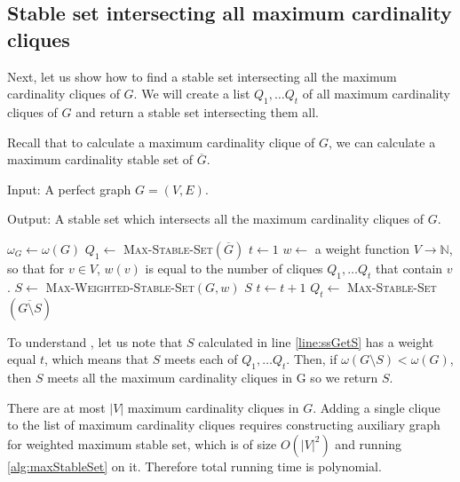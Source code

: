 \subsection{Stable set intersecting all maximum cardinality cliques}
Next, let us show how to find a stable set intersecting all the maximum cardinality cliques of $G$. We will create a list $Q_1, \ldots Q_t$ of all maximum cardinality cliques of $G$ and return a stable set intersecting them all.

Recall that to calculate a maximum cardinality clique of $G$, we can calculate a maximum cardinality stable set of $\overline{G}$.
\begin{alg}
  \label{alg:ssIntersectingCliques}
  Input: A perfect graph $G = (V, E)$.

  \noindent Output: A stable set which intersects all the maximum cardinality cliques of $G$.
\end{alg}

\begin{algorithmic}[1]
    \ls $\omega_G \gets \omega(G)$
    \ls $Q_1 \gets$ \textsc{Max-Stable-Set}$(\overline{G})$
    \ls $t \gets 1$
      \ls $w \gets$ a weight function $V \rightarrow \mathbb{N}$, so that for $v \in V$, $w(v)$ is equal to
      \lsx the number of cliques $Q_1, \ldots Q_t$ that contain $v$.
      \ls $S \gets$ \textsc{Max-Weighted-Stable-Set}$(G, w)$ \label{line:ssGetS}
        \ls \RETURN $S$
      \mElse
        \ls $t \gets t+1$ \vspace{-.1cm}
        \ls $Q_t \gets$ \textsc{Max-Stable-Set}$(\overline{G \setminus S})$
      \mEndIf
    \mEndWhile
  \mEndProcedure
\end{algorithmic}

To understand , let us note that $S$ calculated in line \ref{line:ssGetS} has a weight equal $t$, which means that $S$ meets each of $Q_1, \ldots Q_t$. Then, if $\omega(G \setminus S) < \omega(G)$, then $S$ meets all the maximum cardinality cliques in G so we return $S$.

There are at most $|V|$ maximum cardinality cliques in $G$. Adding a single clique to the list of maximum cardinality cliques requires constructing auxiliary graph for weighted maximum stable set, which is of size $O(|V|^2)$ and running \cref{alg:maxStableSet} on it. Therefore total running time is polynomial.

